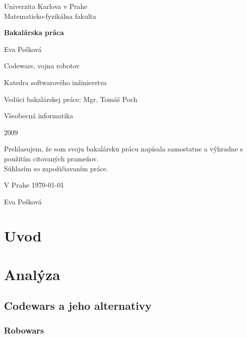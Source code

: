 \documentclass[12pt,notitlepage]{report}
\begin{document}
\begin{titlepage}
\begin{center}
\vspace{1.5in}
{\rm Univerzita Karlova v Prahe\\
    Matematicko-fyzikálna fakulta}
\par
\vspace{0.7in}
{\huge \bf Bakalárska práca}
\par
\vspace{0.5in}
{Eva Pešková}
\par
\vspace{0.5in}
Codewars, vojna robotov
\par
\vfill
Katedra softwarového inžinierstva
\par
\vspace{0.5in}
Vedúci bakalárskej práce: Mgr. Tomáš Poch
\par
\vspace{0.5in}
Všeobecná informatika
\par
\vspace{0.5in}
2009
\end{center}
\end{titlepage}
\vfill
Prehlasujem, že som svoju bakalársku prácu napísala samostatne a výhradne s použitím citovaných prameňov.\\
Súhlasím so zapožičiavaním práce.\\
\par
V Prahe \today
\begin{flushright}
Eva Pešková
\end{flushright}

\newtheorem{definicia}{Značenie}

\tableofcontents
\chapter{Uvod}%

\chapter{Analýza}
%

\section{Codewars a jeho alternativy}
\subsection {Robowars}
\end{document}
